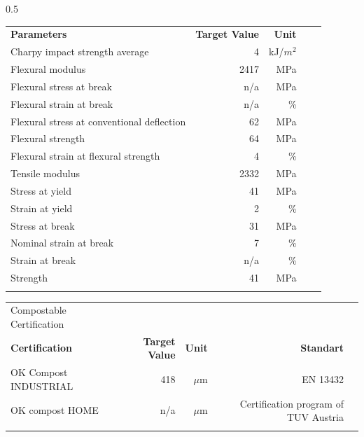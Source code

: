 \documentclass{article}
\begin{document}
\begin{center}
\begin{paracol}{2}
\begin{tabularx}{0.5\textwidth}
\end{tabularx}\switchcolumn\begin{tabularx}{0.5\textwidth}
{X r  r  r  r }\textbf{Parameters} & \textbf{Target Value} & \textbf{Unit} &  &  \\
Charpy impact strength average & 4 & kJ/\(m^2\) &  &  \\
\arrayrulecolor{line_color}\hline
Flexural modulus & 2417 & MPa &  &  \\
\arrayrulecolor{line_color}\hline
Flexural stress at break & n/a & MPa &  &  \\
\arrayrulecolor{line_color}\hline
Flexural strain at break & n/a & \% &  &  \\
\arrayrulecolor{line_color}\hline
Flexural stress at conventional deflection & 62 & MPa &  &  \\
\arrayrulecolor{line_color}\hline
Flexural strength & 64 & MPa &  &  \\
\arrayrulecolor{line_color}\hline
Flexural strain at flexural strength & 4 & \% &  &  \\
\arrayrulecolor{line_color}\hline
Tensile modulus & 2332 & MPa &  &  \\
\arrayrulecolor{line_color}\hline
Stress at yield & 41 & MPa &  &  \\
\arrayrulecolor{line_color}\hline
Strain at yield & 2 & \% &  &  \\
\arrayrulecolor{line_color}\hline
Stress at break & 31 & MPa &  &  \\
\arrayrulecolor{line_color}\hline
Nominal strain at break & 7 & \% &  &  \\
\arrayrulecolor{line_color}\hline
Strain at break & n/a & \% &  &  \\
\arrayrulecolor{line_color}\hline
Strength & 41 & MPa &  &  \\
\arrayrulecolor{line_color}\hline

\end{tabularx}
\end{paracol}
\end{center}
\begin{center}
\begin{tabularx}
{\textwidth}{X r  r  r  r }\rowcolor{color_title}Compostable Certification &  &  &  &  \\
\textbf{Certification} & \textbf{Target Value} & \textbf{Unit} & \textbf{Standart} &  \\
OK Compost INDUSTRIAL & 418 & \(\mu\)m & EN 13432 &  \\
\arrayrulecolor{line_color}\hline
OK compost HOME & n/a & \(\mu\)m & Certification program of TUV Austria &  \\
\arrayrulecolor{line_color}\hline

\end{tabularx}
\end{center}
\end{document}
